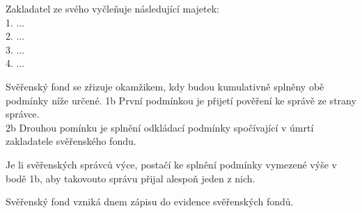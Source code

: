 \documentclass[parskip=half]{scrreprt}
\begin{document}
\begin{contract}
Zakladatel ze svého vyčleňuje následující majetek:\\
1. ...\\
2. ...\\
3. ...\\
4. ...\\




Svěřenský fond se zřizuje okamžikem, kdy budou kumulativně splněny obě podmínky níže určené.
1b První podmínkou je přijetí pověření ke správě ze strany správce.\\
2b Drouhou pomínku je splnění odkládací podmínky spočívající v úmrtí zakladatele svěřenského fondu.


Je li svěřenských správců výce, postačí ke splnění podmínky vymezené výše v bodě 1b, aby takovouto správu přijal alespoň jeden z nich.



Svěřenský fond vzniká dnem zápisu do evidence svěřenských fondů.



\end{contract}
\end{document}
